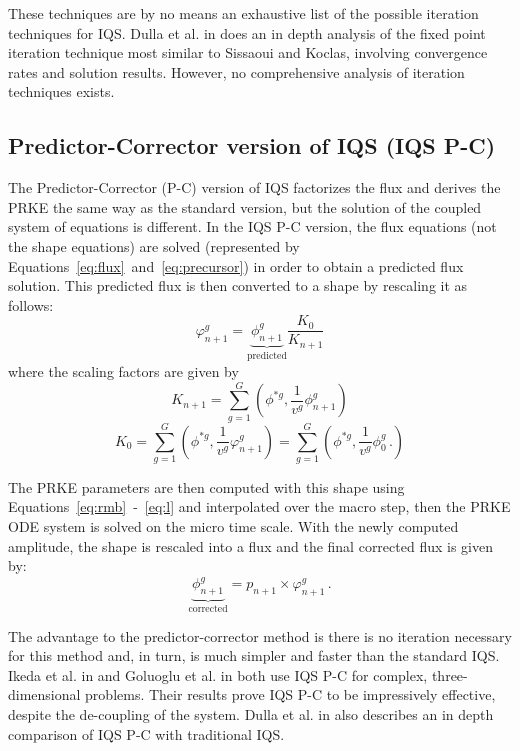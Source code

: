 \documentclass[12pt]{scrartcl}
\newcommand{\be}{\begin{equation}}
\newcommand{\ee}{\end{equation}}
\begin{document}
These techniques are by no means an exhaustive list of the possible iteration techniques for IQS. Dulla et al. in \cite{Dulla2008} does an in depth analysis of the fixed point iteration technique most similar to Sissaoui and Koclas, involving convergence rates and solution results.  However, no comprehensive analysis of iteration techniques exists.


\subsection{Predictor-Corrector version of IQS (IQS P-C)}
\label{sect:pc}

The Predictor-Corrector (P-C) version of IQS factorizes the flux and derives the PRKE the same way as the standard version, but the solution of the coupled system of equations is different.  In the IQS P-C version, the flux equations (not the shape equations) are solved (represented by Equations~\ref{eq:flux}~and~\ref{eq:precursor}) in order to obtain a predicted flux solution. This predicted flux is then converted to a shape by rescaling it as follows:
\be
\varphi^g_{n+1} = \underbrace{\phi^g_{n+1}}_{\text{predicted}} \frac{K_0}{K_{n+1}}
\label{eq:rescale}
\ee
where the scaling factors are given by
\be
K_{n+1} =\sum_{g=1}^G\left(\phi^{*g},\frac{1}{v^g}\phi^g_{n+1}\right)
\ee
\be
K_{0} =\sum_{g=1}^G\left(\phi^{*g},\frac{1}{v^g}\varphi^g_{n+1}\right)=\sum_{g=1}^G\left(\phi^{*g},\frac{1}{v^g}\phi^g_{0} \,.\right)
\ee

The PRKE parameters are then computed with this shape using Equations~\ref{eq:rmb}~-~\ref{eq:l} and interpolated over the macro step, then the PRKE ODE system is solved on the micro time scale.  With the newly computed amplitude, the shape is rescaled into a flux and the final corrected flux is given by:
\be
\underbrace{\phi^g_{n+1}}_{\text{corrected}} = p_{n+1} \times \varphi^g_{n+1} \,.
\ee

The advantage to the predictor-corrector method is there is no iteration necessary for this method and, in turn, is much simpler and faster than the standard IQS.  Ikeda et al. in \cite{Ikeda_2001} and Goluoglu et al. in \cite{Goluoglu_2001} both use IQS P-C for complex, three-dimensional problems.  Their results prove IQS P-C to be impressively effective, despite the de-coupling of the system.  Dulla et al. in \cite{Dulla2008} also describes an in depth comparison of IQS P-C with traditional IQS.
\end{document}
